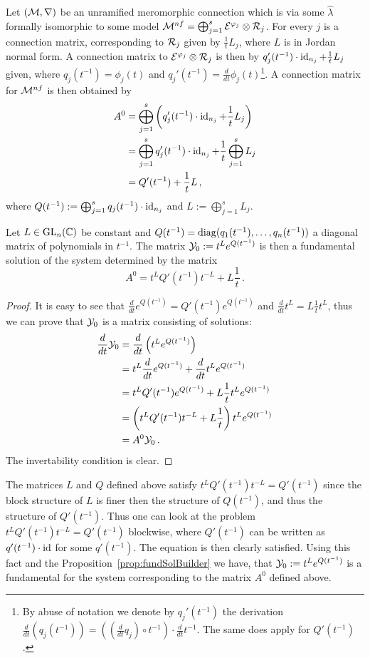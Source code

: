 Let $(\mathcal{M},\nabla)$ be an unramified meromorphic connection which is via some
$\hat\lambda$ formally isomorphic to some model
$\mathcal{M}^{nf}=\bigoplus_{j=1}^s\mathcal{E}^{\varphi_j}\otimes\mathcal{R}_j$.
For every $j$ is a connection matrix, corresponding to $\mathcal{R}_j$ given by
$\frac{1}{t}L_j$, where $L$ is in Jordan normal form.
A connection matrix to $\mathcal{E}^{\varphi_j}\otimes\mathcal{R}_j$ is then by
$q_j'(t^{-1})\cdot\operatorname{id}_{n_j}+\frac{1}{t}L_j$ given\TODO[(cf.~???)], where
$q_j(t^{-1})=\phi_j(t)$ and $q_j'(t^{-1})=\frac{d}{dt}\phi_j(t)$\footnote{By
abuse of notation we denote by $q_j'(t^{-1})$ the derivation
$\frac{d}{dt}(q_j(t^{-1}))=\left(\left(\frac{d}{dt}q_j\right)\circ t^{-1}\right)
\cdot\frac{d}{dt}t^{-1}$. The same does apply for $Q'(t^{-1})$.}.
A connection matrix for $\mathcal{M}^{nf}$ is then obtained by
\begin{align*}
  A^0&= \bigoplus_{j=1}^s
  \left(q_j'(t^{-1})\cdot\operatorname{id}_{n_j}+\frac{1}{t}L_j\right)
  \\&=\bigoplus_{j=1}^sq_j'(t^{-1})\cdot\operatorname{id}_{n_j}
    +\frac{1}{t}\bigoplus_{j=1}^sL_j
  \\&=Q'(t^{-1})+\frac{1}{t}L \,,
\end{align*}
where
$Q(t^{-1}):=\bigoplus_{j=1}^sq_j(t^{-1})\cdot\operatorname{id}_{n_j}$
and $L:=\bigoplus_{j=1}^sL_j$.
\begin{prop}\label{prop:fundSolBuilder}
  Let $L\in \operatorname{GL}_n(\mathbb{C})$ be constant and
  $Q(t^{-1})=\operatorname{diag}(q_1(t^{-1}),\dots,q_n(t^{-1}))$ a diagonal matrix of
  polynomials in $t^{-1}$.
  The matrix $\mathcal{Y}_0:=t^L e^{Q(t^{-1})}$ is then a fundamental solution of the
  system determined by the matrix
  \[
    A^0=t^LQ'(t^{-1})t^{-L}+L\frac{1}{t} \,.
  \]
\end{prop}
\begin{proof}
  It is easy to see that $\frac{d}{dt}e^{Q(t^{-1})}=Q'(t^{-1})e^{Q(t^{-1})}$
  and $\frac{d}{dt}t^L=L\frac{1}{t}t^L$, thus we can prove
  that $\mathcal{Y}_0$ is a matrix consisting of solutions:
  \begin{align*}
    \frac{d}{dt}\mathcal{Y}_0
    &=\frac{d}{dt}\left(t^Le^{Q(t^{-1})}\right)
  \\&= t^L\frac{d}{dt}e^{Q(t^{-1})} + \frac{d}{dt}t^Le^{Q(t^{-1})}
  \\&= t^LQ'(t^{-1})e^{Q(t^{-1})} + L\frac{1}{t}t^Le^{Q(t^{-1})}
  \\&=\left(t^LQ'(t^{-1})t^{-L}+L\frac{1}{t}\right)t^Le^{Q(t^{-1})}
  \\&=A^0\mathcal{Y}_0 \,.
  \end{align*}
  The invertability condition is clear.
\end{proof}
The matrices $L$ and $Q$ defined above satisfy $t^LQ'(t^{-1})t^{-L}=Q'(t^{-1})$
since the block structure of $L$ is finer then the structure of $Q(t^{-1})$,
and thus the structure of $Q'(t^{-1})$. Thus one can look at the problem
$t^LQ'(t^{-1})t^{-L}=Q'(t^{-1})$ blockwise, where $Q'(t^{-1})$ can be written
as $q'(t^{-1})\cdot\operatorname{id}$ for some $q'(t^{-1})$. The equation is then clearly
satisfied.
Using this fact and the Proposition~\ref{prop:fundSolBuilder} we have, that
$\mathcal{Y}_0:=t^Le^{Q(t^{-1})}$ is a fundamental for the system corresponding to the
matrix $A^0$ defined above.

